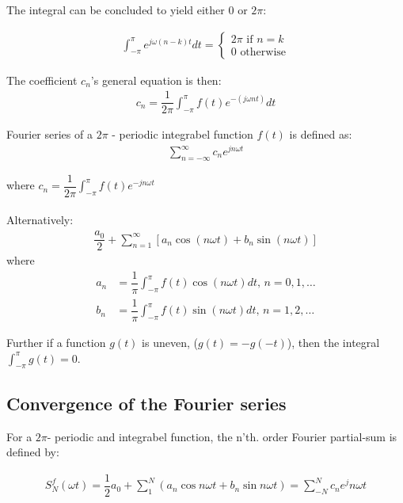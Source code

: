 The integral can be concluded to yield either $0$ or $2\pi$:

\begin{align}
	\int_{-\pi}^{\pi} e^{j \omega (n-k)t}dt 
	= 
	\begin{cases}
			2\pi \text{ if } n=k\\
			0 \text{ otherwise}
	\end{cases}
\end{align}

The coefficient $c_n$'s general equation is then:
\begin{align*}
	c_n = \dfrac{1}{2\pi} \int_{-\pi}^{\pi} f(t) e^{-(j \omega nt)}dt
\end{align*} 

\begin{definition} \label{def:fourier_definition}
Fourier series of a $2\pi$ - periodic integrabel function $f(t)$ is defined as:
\begin{align*}
	\sum_{n=-\infty}^\infty c_n e^{j n \omega t}
\end{align*}

where $c_n = \dfrac{1}{2\pi}\int_{- \pi}^\pi f(t) e^{-j n \omega t}$
\\\\
Alternatively:
\begin{align*}
	\dfrac{a_0}{2} + \sum_{n=1}^{\infty} \left[ a_n \cos(n \omega t) + b_n \sin(n \omega t)\right]
\end{align*} 
where
\begin{align*}
	a_n 
	&= \dfrac{1}{\pi} \int_{-\pi}^\pi f(t) \cos (n \omega t) dt, \, n=0,1,\dots\\
	b_n
	&= \dfrac{1}{\pi} \int_{-\pi}^\pi f(t) \sin (n \omega t) dt, \, n=1,2,\dots	
\end{align*}
\end{definition}

Further if a function $g(t)$ is uneven, ($g(t) = -g(-t)$), then the integral $\int_{-\pi}^\pi g(t) = 0$.

\subsection{Convergence of the Fourier series}
For a $2\pi$- periodic and integrabel function, the n'th. order Fourier partial-sum is defined by: 

\begin{align}\label{eq:partialsumFourierSeries}
	S_N^f(\omega t) = \dfrac{1}{2} a_0 + \sum_1^N\left(a_n \cos n\omega t + b_n \sin n \omega t \right) = \sum_{-N}^N c_n e^jn\omega t
\end{align}

